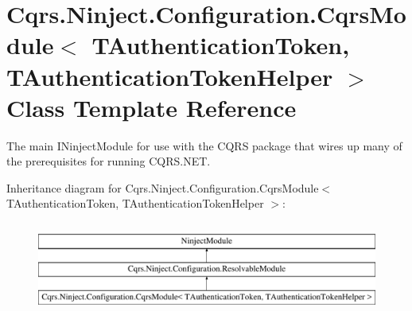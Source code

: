 \hypertarget{classCqrs_1_1Ninject_1_1Configuration_1_1CqrsModule}{}\section{Cqrs.\+Ninject.\+Configuration.\+Cqrs\+Module$<$ T\+Authentication\+Token, T\+Authentication\+Token\+Helper $>$ Class Template Reference}
\label{classCqrs_1_1Ninject_1_1Configuration_1_1CqrsModule}


The main I\+Ninject\+Module for use with the C\+Q\+RS package that wires up many of the prerequisites for running C\+Q\+R\+S.\+N\+ET.  


Inheritance diagram for Cqrs.\+Ninject.\+Configuration.\+Cqrs\+Module$<$ T\+Authentication\+Token, T\+Authentication\+Token\+Helper $>$\+:\begin{figure}[H]
\begin{center}
\leavevmode
\includegraphics[height=3.000000cm]{classCqrs_1_1Ninject_1_1Configuration_1_1CqrsModule}
\end{center}
\end{figure}
